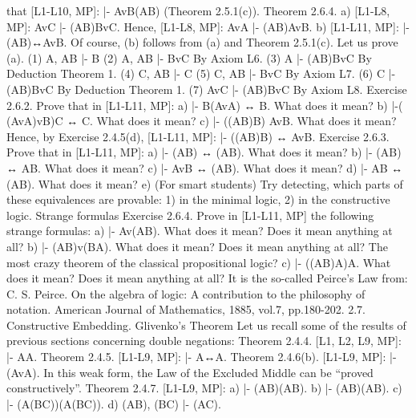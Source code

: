 that [L1-L10, MP]: |- \neg AvB\IMPLIES (A\IMPLIES B) (Theorem 2.5.1(c)).
Theorem 2.6.4. a) [L1-L8, MP]: AvC |- (A\IMPLIES B)\IMPLIES BvC. Hence, [L1-L8, MP]: Av\neg A |- (A\IMPLIES B)\IMPLIES \neg AvB.
b) [L1-L11, MP]: |- (A\IMPLIES B)↔\neg AvB.
Of course, (b) follows from (a) and Theorem 2.5.1(c). Let us prove (a).
(1) A, A\IMPLIES B |- B
(2) A, A\IMPLIES B |- BvC By Axiom L6.
(3) A |- (A\IMPLIES B)\IMPLIES BvC By Deduction Theorem 1.
(4) C, A\IMPLIES B |- C
(5) C, A\IMPLIES B |- BvC By Axiom L7.
(6) C |- (A\IMPLIES B)\IMPLIES BvC By Deduction Theorem 1.
(7) AvC |- (A\IMPLIES B)\IMPLIES BvC
By Axiom L8.
Exercise 2.6.2. Prove that in [L1-L11, MP]:
a) |- B\AND (Av\neg A) ↔ B. What does it mean?
b) |-( (Av\neg A)vB)\AND C ↔ C. What does it mean?
c) |- ((A\IMPLIES B)\IMPLIES B) \IMPLIES  AvB. What does it mean? Hence, by Exercise 2.4.5(d), [L1-L11, MP]: |-
((A\IMPLIES B)\IMPLIES B) ↔ AvB.
Exercise 2.6.3. Prove that in [L1-L11, MP]:
a) |- (A\IMPLIES B) ↔ \neg (A\AND \neg B). What does it mean?
b) |- \neg (A\IMPLIES B) ↔ A\AND \neg B. What does it mean?
c) |- AvB ↔ (\neg A\IMPLIES B). What does it mean?
d) |- A\AND B ↔ \neg (A\IMPLIES \neg B). What does it mean?
e) (For smart students) Try detecting, which parts of these equivalences are provable: 1) in the minimal
logic, 2) in the constructive logic.
Strange formulas
Exercise 2.6.4. Prove in [L1-L11, MP] the following strange formulas:
a) |- Av(A\IMPLIES B). What does it mean? Does it mean anything at all?
b) |- (A\IMPLIES B)v(B\IMPLIES A). What does it mean? Does it mean anything at all? The most crazy theorem of the
classical propositional logic?
c) |- ((A\IMPLIES B)\IMPLIES A)\IMPLIES A. What does it mean? Does it mean anything at all? It is the so-called Peirce's Law
from:
C. S. Peirce. On the algebra of logic: A contribution to the philosophy of notation. American Journal of Mathematics, 1885,
vol.7, pp.180-202.
2.7. Constructive Embedding. Glivenko's Theorem
Let us recall some of the results of previous sections concerning double negations:
Theorem 2.4.4. [L1, L2, L9, MP]: |- A\IMPLIES \neg \neg A.
Theorem 2.4.5. [L1-L9, MP]: |- \neg \neg \neg A↔\neg A.
Theorem 2.4.6(b). [L1-L9, MP]: |- \neg \neg (Av\neg A). In this weak form, the Law of the Excluded Middle can be
``proved constructively''.
Theorem 2.4.7. [L1-L9, MP]: a) |- (A\IMPLIES B)\IMPLIES (\neg \neg A\IMPLIES \neg \neg B).
b) |- \neg \neg (A\IMPLIES B)\IMPLIES (\neg \neg A\IMPLIES \neg \neg B).
c) |- (A\IMPLIES (B\IMPLIES C))\IMPLIES (\neg \neg A\IMPLIES (\neg \neg B\IMPLIES \neg \neg C)).
d) \neg \neg (A\IMPLIES B), \neg \neg (B\IMPLIES C) |- \neg \neg (A\IMPLIES C).
